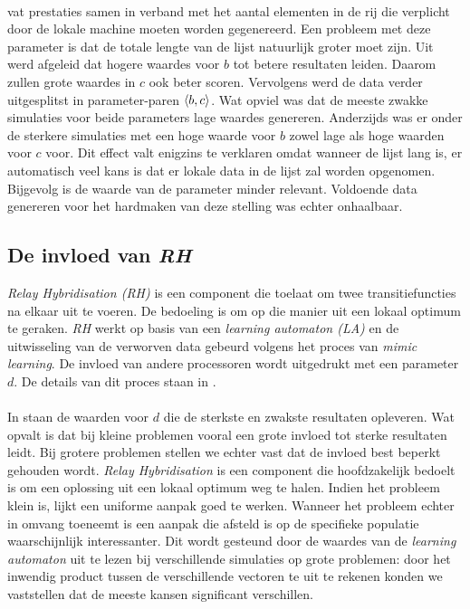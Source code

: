 \paragraph{}
 vat prestaties samen in verband met het aantal elementen in de rij die verplicht door de lokale machine moeten worden gegenereerd. Een probleem met deze parameter is dat de totale lengte van de lijst natuurlijk groter moet zijn. Uit  werd afgeleid dat hogere waardes voor $b$ tot betere resultaten leiden. Daarom zullen grote waardes in $c$ ook beter scoren. Vervolgens werd de data verder uitgesplitst in parameter-paren $\left\langle b,c\right\rangle$. Wat opviel was dat de meeste zwakke simulaties voor beide parameters lage waardes genereren. Anderzijds was er onder de sterkere simulaties met een hoge waarde voor $b$ zowel lage als hoge waarden voor $c$ voor. Dit effect valt enigzins te verklaren omdat wanneer de lijst lang is, er automatisch veel kans is dat er lokale data in de lijst zal worden opgenomen. Bijgevolg is de waarde van de parameter minder relevant. Voldoende data genereren voor het hardmaken van deze stelling was echter onhaalbaar.


\subsection{De invloed van \emph{RH}}

\emph{Relay Hybridisation (RH)} is een component die toelaat om twee transitiefuncties na elkaar uit te voeren. De bedoeling is om op die manier uit een lokaal optimum te geraken. \emph{RH} werkt op basis van een \emph{learning automaton (LA)} en de uitwisseling van de verworven data gebeurd volgens het proces van \emph{mimic learning}. De invloed van andere processoren wordt uitgedrukt met een parameter $d$. De details van dit proces staan in .


\paragraph{}
In  staan de waarden voor $d$ die de sterkste en zwakste resultaten opleveren. Wat opvalt is dat bij kleine problemen vooral een grote invloed tot sterke resultaten leidt. Bij grotere problemen stellen we echter vast dat de invloed best beperkt gehouden wordt. \emph{Relay Hybridisation} is een component die hoofdzakelijk bedoelt is om een oplossing uit een lokaal optimum weg te halen. Indien het probleem klein is, lijkt een uniforme aanpak goed te werken. Wanneer het probleem echter in omvang toeneemt is een aanpak die afsteld is op de specifieke populatie waarschijnlijk interessanter. Dit wordt gesteund door de waardes van de \emph{learning automaton} uit te lezen bij verschillende simulaties op grote problemen: door het inwendig product tussen de verschillende vectoren te uit te rekenen konden we vaststellen dat de meeste kansen significant verschillen.


